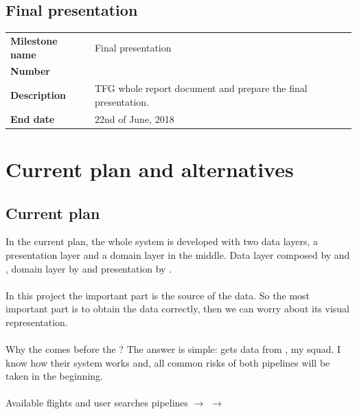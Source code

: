
\subsection{Final presentation}

\begin{table}[H]
\begin{tabular}{>{\raggedleft\arraybackslash}p{3cm}>{\raggedright\arraybackslash}p{11cm}}
\textbf{Milestone name} & Final presentation \\
\textbf{Number}      & 31 \\
\textbf{Description} & TFG whole report document and prepare the final presentation. \\
\textbf{End date}    & 22nd of June, 2018 \\
\end{tabular}
\label{milestone7}
\end{table}


\section{Current plan and alternatives}

\subsection{Current plan}

In the current plan, the whole system is developed with two data layers, a presentation layer and a domain layer in the middle. Data layer composed by  and , domain layer by  and presentation by .
\\\\
In this project the important part is the source of the data. So the most important part is to obtain the data correctly, then we can worry about its visual representation.
\\\\
Why the  comes before the ? The answer is simple:  gets data from \squad, my squad. I know how their system works and, all common risks of both pipelines will be taken in the beginning. 
\\\\
Available flights and user searches pipelines $\longrightarrow$  $\longrightarrow$ 

